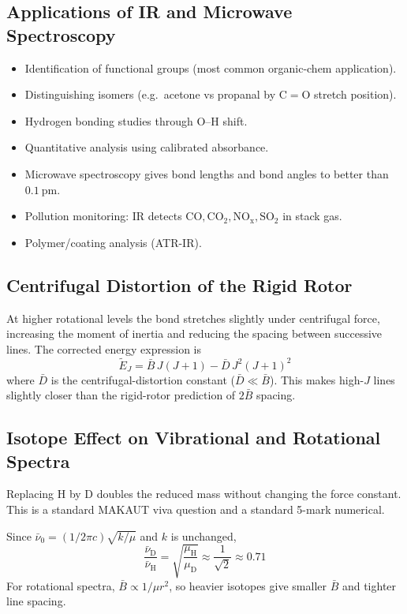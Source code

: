 \documentclass[12pt,a4paper]{article}
\begin{document}
\subsection{Applications of IR and Microwave Spectroscopy}
\begin{itemize}[leftmargin=*, itemsep=2pt, topsep=2pt]
  \item Identification of functional groups (most common organic-chem application).
  \item Distinguishing isomers (e.g.\ acetone vs propanal by C${=}$O stretch position).
  \item Hydrogen bonding studies through O--H shift.
  \item Quantitative analysis using calibrated absorbance.
  \item Microwave spectroscopy gives bond lengths and bond angles to better than $0.1\ \mathrm{pm}$.
  \item Pollution monitoring: IR detects $\mathrm{CO}, \mathrm{CO_2}, \mathrm{NO_x}, \mathrm{SO_2}$ in stack gas.
  \item Polymer/coating analysis (ATR-IR).
\end{itemize}

\subsection{Centrifugal Distortion of the Rigid Rotor}
At higher rotational levels the bond stretches slightly under centrifugal force, increasing the moment of inertia and reducing the spacing between successive lines. The corrected energy expression is
\[
\tilde{E}_J = \bar{B}\,J(J+1) - \bar{D}\,J^{2}(J+1)^{2}
\]
where $\bar{D}$ is the centrifugal-distortion constant ($\bar{D}\ll \bar{B}$). This makes high-$J$ lines slightly closer than the rigid-rotor prediction of $2\bar{B}$ spacing.

\subsection{Isotope Effect on Vibrational and Rotational Spectra}
Replacing $\mathrm{H}$ by $\mathrm{D}$ doubles the reduced mass without changing the force constant. This is a standard MAKAUT viva question and a standard 5-mark numerical.

\begin{tcolorbox}[formulabox, title={Effect of Isotopic Substitution}]
Since $\bar{\nu}_0=(1/2\pi c)\sqrt{k/\mu}$ and $k$ is unchanged,
\[
\frac{\bar{\nu}_{\mathrm{D}}}{\bar{\nu}_{\mathrm{H}}}=\sqrt{\frac{\mu_{\mathrm{H}}}{\mu_{\mathrm{D}}}}\approx \frac{1}{\sqrt{2}}\approx 0.71
\]
For rotational spectra, $\bar{B}\propto 1/\mu r^{2}$, so heavier isotopes give smaller $\bar{B}$ and tighter line spacing.
\end{tcolorbox}
\end{document}
